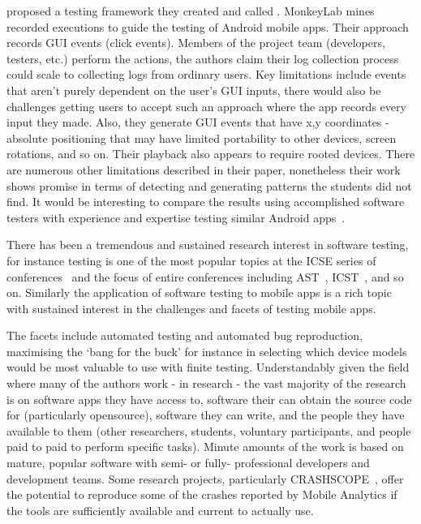\citeauthor{linares2015_mining_android_app_execution_traces_etc} proposed a testing framework they created and called . MonkeyLab mines recorded executions to guide the testing of Android mobile apps. Their approach records GUI events (click events). Members of the project team (developers, testers, etc.) perform the actions, the authors claim their log collection process could scale to collecting logs from ordinary users. Key limitations include events that aren't purely dependent on the user's GUI inputs, there would also be challenges getting users to accept such an approach where the app records every input they made. Also, they generate GUI events that have x,y coordinates - absolute positioning that may have limited portability to other devices, screen rotations, and so on. Their playback also appears to require rooted devices. There are numerous other limitations described in their paper, nonetheless their work shows promise in terms of detecting and generating patterns the students did not find. It would be interesting to compare the results using accomplished software testers with experience and expertise testing similar Android apps~.

There has been a tremendous and sustained research interest in software testing, for instance testing is one of the most popular topics at the ICSE series of conferences~ and the focus of entire conferences including AST~, ICST~, and so on. Similarly the application of software testing to mobile apps is a rich topic with sustained interest in the challenges and facets of testing mobile apps.

The facets include automated testing and automated bug reproduction, maximising the `bang for the buck' for instance in selecting which device models would be most valuable to use with finite testing. Understandably given the field where many of the authors work - in research - the vast majority of the research is on software apps they have access to, software their can obtain the source code for (particularly opensource), software they can write, and the people they have available to them (other researchers, students, voluntary participants, and people paid to paid to perform specific tasks). Minute amounts of the work is based on mature, popular software with semi- or fully- professional developers and development teams. Some research projects, particularly CRASHSCOPE~, offer the potential to reproduce some of the crashes reported by Mobile Analytics if the tools are sufficiently available and current to actually use.


